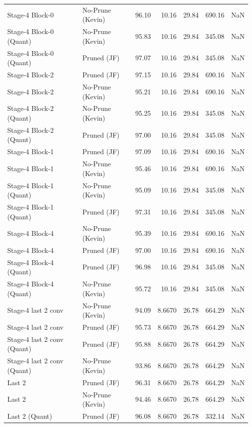 \begin{table}
\begin{tabular}{llrrrrl}
Stage-4 Block-0 & No-Prune (Kevin) & 96.10 & 10.16 & 29.84 & 690.16 & NaN \\
Stage-4 Block-0
(Quant) & No-Prune (Kevin) & 95.83 & 10.16 & 29.84 & 345.08 & NaN \\
Stage-4 Block-0
(Quant) & Pruned (JF) & 97.07 & 10.16 & 29.84 & 345.08 & NaN \\
Stage-4 Block-2 & Pruned (JF) & 97.15 & 10.16 & 29.84 & 690.16 & NaN \\
Stage-4 Block-2 & No-Prune (Kevin) & 95.21 & 10.16 & 29.84 & 690.16 & NaN \\
Stage-4 Block-2
(Quant) & No-Prune (Kevin) & 95.25 & 10.16 & 29.84 & 345.08 & NaN \\
Stage-4 Block-2
(Quant) & Pruned (JF) & 97.00 & 10.16 & 29.84 & 345.08 & NaN \\
Stage-4 Block-1 & Pruned (JF) & 97.09 & 10.16 & 29.84 & 690.16 & NaN \\
Stage-4 Block-1 & No-Prune (Kevin) & 95.46 & 10.16 & 29.84 & 690.16 & NaN \\
Stage-4 Block-1
(Quant) & No-Prune (Kevin) & 95.09 & 10.16 & 29.84 & 345.08 & NaN \\
Stage-4 Block-1
(Quant) & Pruned (JF) & 97.31 & 10.16 & 29.84 & 345.08 & NaN \\
Stage-4 Block-4 & No-Prune (Kevin) & 95.39 & 10.16 & 29.84 & 690.16 & NaN \\
Stage-4 Block-4 & Pruned (JF) & 97.00 & 10.16 & 29.84 & 690.16 & NaN \\
Stage-4 Block-4
(Quant) & Pruned (JF) & 96.98 & 10.16 & 29.84 & 345.08 & NaN \\
Stage-4 Block-4
(Quant) & No-Prune (Kevin) & 95.72 & 10.16 & 29.84 & 345.08 & NaN \\
Stage-4 last 2 conv & No-Prune (Kevin) & 94.09 & 8.6670 & 26.78 & 664.29 & NaN \\
Stage-4 last 2 conv & Pruned (JF) & 95.73 & 8.6670 & 26.78 & 664.29 & NaN \\
Stage-4 last 2 conv
(Quant) & Pruned (JF) & 95.88 & 8.6670 & 26.78 & 664.29 & NaN \\
Stage-4 last 2 conv
(Quant) & No-Prune (Kevin) & 93.86 & 8.6670 & 26.78 & 664.29 & NaN \\
Last 2 & Pruned (JF) & 96.31 & 8.6670 & 26.78 & 664.29 & NaN \\
Last 2 & No-Prune (Kevin) & 94.46 & 8.6670 & 26.78 & 664.29 & NaN \\
Last 2
(Quant) & Pruned (JF) & 96.08 & 8.6670 & 26.78 & 332.14 & NaN \\

\end{tabular}
\end{table}
